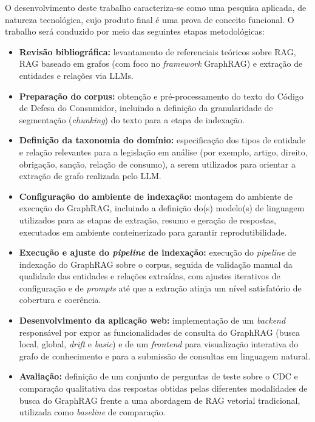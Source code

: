 O desenvolvimento deste trabalho caracteriza-se como uma pesquisa aplicada, de
natureza tecnológica, cujo produto final é uma prova de conceito funcional. O
trabalho será conduzido por meio das seguintes etapas metodológicas:

\begin{itemize}
    \item \textbf{Revisão bibliográfica:} levantamento de referenciais
    teóricos sobre RAG, RAG baseado em grafos (com foco no \textit{framework}
    GraphRAG) e extração de entidades e relações via LLMs.

    \item \textbf{Preparação do corpus:} obtenção e pré-processamento do texto
    do Código de Defesa do Consumidor, incluindo a definição da granularidade
    de segmentação (\textit{chunking}) do texto para a etapa de indexação.

    \item \textbf{Definição da taxonomia do domínio:} especificação dos tipos
    de entidade e relação relevantes para a legislação em análise (por
    exemplo, artigo, direito, obrigação, sanção, relação de consumo), a serem
    utilizados para orientar a extração de grafo realizada pelo LLM.

    \item \textbf{Configuração do ambiente de indexação:} montagem do
    ambiente de execução do GraphRAG, incluindo a definição do(s) modelo(s) de
    linguagem utilizados para as etapas de extração, resumo e geração de
    respostas, executados em ambiente conteinerizado para garantir
    reprodutibilidade.

    \item \textbf{Execução e ajuste do \textit{pipeline} de indexação:}
    execução do \textit{pipeline} de indexação do GraphRAG sobre o corpus,
    seguida de validação manual da qualidade das entidades e relações
    extraídas, com ajustes iterativos de configuração e de \textit{prompts}
    até que a extração atinja um nível satisfatório de cobertura e
    coerência.

    \item \textbf{Desenvolvimento da aplicação web:} implementação de um
    \textit{backend} responsável por expor as funcionalidades de consulta do
    GraphRAG (busca local, global, \textit{drift} e \textit{basic}) e de um
    \textit{frontend} para visualização interativa do grafo de conhecimento e
    para a submissão de consultas em linguagem natural.

    \item \textbf{Avaliação:} definição de um conjunto de perguntas de teste
    sobre o CDC e comparação qualitativa das respostas obtidas pelas
    diferentes modalidades de busca do GraphRAG frente a uma abordagem de RAG
    vetorial tradicional, utilizada como \textit{baseline} de comparação.
\end{itemize}

